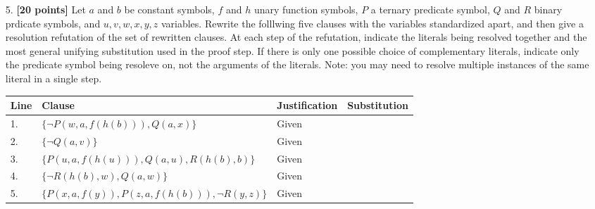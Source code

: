 \documentclass{article}
\begin{document}
\begin{enumerate}
\item[5.] \textbf{[20 points]} Let $a$ and $b$ be constant symbols,
  $f$ and $h$ unary function symbols, $P$ a ternary predicate symbol,
  $Q$ and $R$ binary prdicate symbols, and $u,v,w,x,y,z$ variables.
  Rewrite the folllwing five clauses with the variables standardized
  apart, and then give a resolution refutation of the set of rewritten
  clauses.  At each step of the refutation, indicate the literals
  being resolved together and the most general unifying substitution
  used in the proof step.  If there is only one possible choice of
  complementary literals, indicate only the predicate symbol being
  resoleve on, not the arguments of the literals.  Note: you may need
  to resolve multiple instances of the same literal in a single step.
  \begin{center}
    \begin{tabular}{llll}
      Line & Clause & Justification & Substitution \\ \hline
      1. & $\{ \neg P(w,a,f(h(b))), Q(a,x) \}$ & Given & \\
      2. & $\{ \neg Q(a,v) \}$ & Given & \\ 
      3. & $\{ P(u,a,f(h(u))), Q(a,u), R(h(b),b) \}$ & Given & \\
      4. & $\{ \neg R(h(b),w), Q(a,w) \}$ & Given & \\
      5. & $\{ P(x,a,f(y)), P(z,a,f(h(b))), \neg R(y,z) \}$ & Given & \\ \hline
    \end{tabular}
  \end{center}
\end{enumerate}
\end{document}
